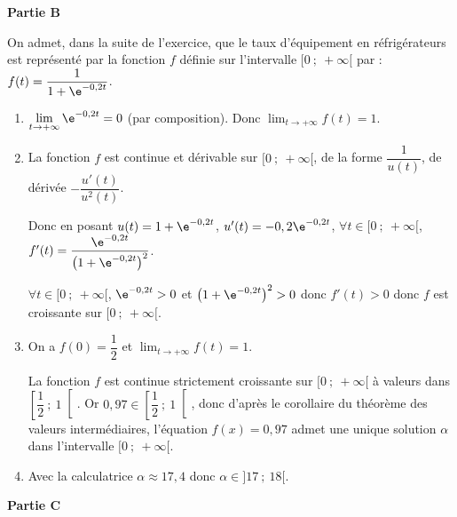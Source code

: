 \textbf{Partie B}

\medskip

On admet, dans la suite de l'exercice, que le taux d'équipement en réfrigérateurs est représenté par la fonction $f$ définie sur l'intervalle $[0~;~+\infty[$ par : $f(t) = \dfrac{1}{1+ \e^{-0,2t}}$.

\begin{enumerate}
	\item $\displaystyle\lim_{t \to + \infty} \e^{-0,2t} = 0$ (par composition). Donc $\displaystyle\lim_{t \to + \infty} f(t)=1$.
	\item La fonction $f$ est continue et dérivable sur $[0~;~+\infty[$, de la forme $\dfrac{1}{u(t)}$, de dérivée $-\dfrac{u'(t)}{u^2(t)}$.

Donc en posant $u(t)=1+ \e^{-0,2t}$, $u'(t)=-0,2\e^{-0,2t}$, $\forall t \in [0~;~+\infty[$, $f'(t)=\dfrac{\e^{-0,2t}}{\left(1+ \e^{-0,2t}\right)^2}$.

$\forall t \in [0~;~+\infty[$, $\e^{-0,2t}>0$ et $\left(1+ \e^{-0,2t}\right)^2>0$ donc $f'(t) > 0$ donc $f$ est croissante sur $[0~;~+\infty[$.
	\item On a $f(0)= \dfrac{1}{2}$ et $\displaystyle\lim_{t \to + \infty} f(t)=1$.

La fonction $f$ est continue strictement croissante sur $[0~;~+\infty[$ à valeurs dans $\left[\dfrac{1}{2}~;~1\right[$. Or $0,97 \in \left[\dfrac{1}{2}~;~1\right[$, donc d'après le corollaire du théorème des valeurs intermédiaires, l'équation $f(x) = 0,97$ admet une unique solution $\alpha$ dans l'intervalle  $[0~;~+\infty[$.
	\item Avec la calculatrice $\alpha \approx 17,4$ donc $\alpha \in ]17~;~18[$.
\end{enumerate}

\medskip

\textbf{Partie C}

\medskip

